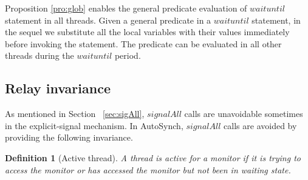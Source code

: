 \documentclass[preprint]{sigplanconf}
\newtheorem{definition}{Definition}
\begin{document}
Proposition \ref{pro:glob} enables the general predicate evaluation of
$waituntil$ statement in all threads. 
Given a general predicate in a $waituntil$ statement, in the sequel we substitute
all the local variables with their values immediately before invoking the
statement. The predicate can be evaluated in all other threads during the
$waituntil$ period. 

\subsection{Relay invariance} \label{sec:relay}
As mentioned in Section ~\ref{sec:sigAll}, $signalAll$ calls are unavoidable
sometimes in the explicit-signal mechanism. In AutoSynch, $signalAll$ calls are 
avoided by providing the following invariance. 

\begin{definition}[Active thread] 
    A thread is active for a monitor if it is trying to access the monitor or
    has accessed the monitor but not been in waiting state. 
\end{definition}
\end{document}
